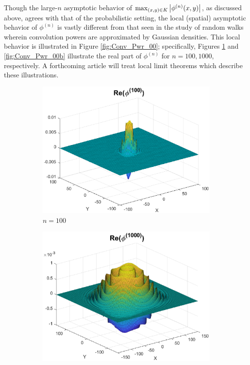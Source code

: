 \documentclass[smallextended]{svjour3}
\theoremstyle{remark}
\begin{document}
\begin{example}
\noindent Though the large-$n$ asymptotic behavior of $\max_{(x,y)\in K}\abs{\phi^{(n)}(x,y)}$, as discussed above, agrees with that of the probabilistic setting, the local (spatial) asymptotic behavior of $\phi^{(n)}$ is vastly different from that seen in the study of random walks wherein convolution powers are approximated by Gaussian densities. This local behavior is illustrated in Figure \ref{fig:Conv_Pwr_00}; specifically, Figures \ref{fig:Conv_Pwr_00a} and \ref{fig:Conv_Pwr_00b} illustrate the real part of $\phi^{(n)}$ for $n = 100, 1000$, respectively. A forthcoming article will treat local limit theorems which describe these illustrations. 

\begin{figure}[!htb]
    \begin{subfigure}{0.49\textwidth}
    \centering
    \includegraphics[scale=0.4]{Fig6a.eps}
    \caption{$n = 100$}
    \label{fig:Conv_Pwr_00a}
    \end{subfigure}
    \begin{subfigure}{0.49\textwidth}
    \centering
    \includegraphics[scale=0.4]{Fig6b.eps}

\end{subfigure}
\end{figure}
\end{example}
\end{document}
